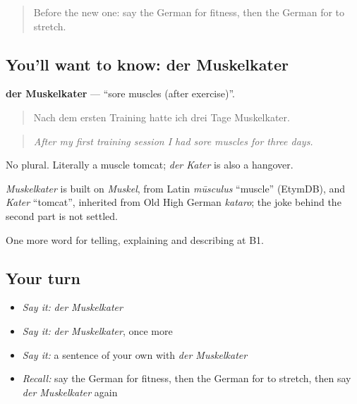 \label{lesson:GE-C505-muskelkater}



\begin{quote}
Before the new one: say the German for fitness, then the German for to stretch.
\end{quote}

\subsection*{You'll want to know: der Muskelkater}
\textbf{der Muskelkater} — \textquotedblleft{}sore muscles (after exercise)\textquotedblright{}.

\begin{quote}
Nach dem ersten Training hatte ich drei Tage Muskelkater.
\end{quote}

\begin{quote}
\emph{After my first training session I had sore muscles for three days.}
\end{quote}

No plural. Literally a muscle tomcat; \emph{der Kater} is also a hangover.

\begin{cousinweb}
\emph{Muskelkater} is built on \emph{Muskel}, from Latin \emph{mūsculus} \textquotedblleft{}muscle\textquotedblright{} (EtymDB), and \emph{Kater} \textquotedblleft{}tomcat\textquotedblright{}, inherited from Old High German \emph{kataro}; the joke behind the second part is not settled.
\end{cousinweb}

\begin{grammarlens}[title={What you've built}]
One more word for telling, explaining and describing at B1.
\end{grammarlens}

\subsection*{Your turn}
\begin{itemize}
\raggedright
  \item \emph{Say it:} \emph{der Muskelkater}
  \item \emph{Say it:} \emph{der Muskelkater}, once more
  \item \emph{Say it:} a sentence of your own with \emph{der Muskelkater}
  \item \emph{Recall:} say the German for fitness, then the German for to stretch, then say \emph{der Muskelkater} again
\end{itemize}

